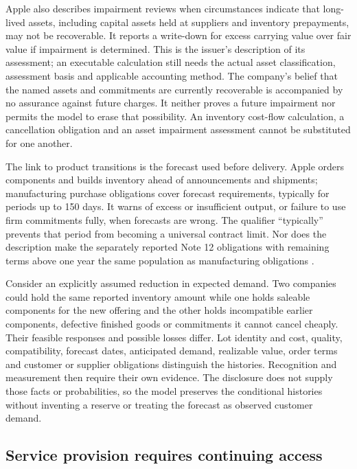Apple also describes impairment reviews when circumstances indicate that
long-lived assets, including capital assets held at suppliers and inventory
prepayments, may not be recoverable. It reports a write-down for excess carrying
value over fair value if impairment is determined. This is the issuer's
description of its assessment; an executable calculation still needs the
actual asset classification, assessment basis and applicable accounting method.
The company's belief that the named assets and commitments are currently
recoverable is accompanied by no assurance against future charges. It neither
proves a future impairment nor permits the model to erase that possibility.
An inventory cost-flow calculation, a cancellation obligation and an asset
impairment assessment cannot be substituted for one another.

The link to product transitions is the forecast used before delivery. Apple
orders components and builds inventory ahead of announcements and shipments;
manufacturing purchase obligations cover forecast requirements, typically for
periods up to 150 days. It warns of excess or insufficient output, or failure
to use firm commitments fully, when forecasts are wrong. The qualifier
``typically'' prevents that period from becoming a universal contract limit.
Nor does the description make the separately reported Note 12 obligations
with remaining terms above one year the same population as manufacturing
obligations \citep[Risk Factors, printed p.~9; Note 12, printed p.~45]{apple2024}.

Consider an explicitly assumed reduction in expected demand. Two companies
could hold the same reported inventory amount while one holds saleable
components for the new offering and the other holds incompatible earlier
components, defective finished goods or commitments it cannot cancel cheaply.
Their feasible responses and possible losses differ. Lot identity and cost,
quality, compatibility, forecast dates, anticipated demand, realizable value,
order terms and customer or supplier obligations distinguish the histories.
Recognition and measurement then require their own evidence. The disclosure
does not supply those facts or probabilities, so the model preserves the
conditional histories without inventing a reserve or treating the forecast as
observed customer demand.

\subsection{Service provision requires continuing access}
\label{sec:apple-service-access}

